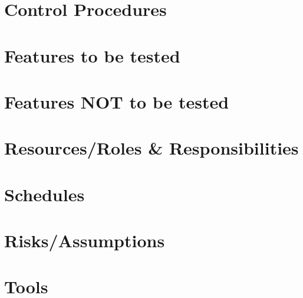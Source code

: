 \documentclass[a4paper, 10pt]{article}
\begin{document}
\section{Control Procedures}

\section{Features to be tested}

\section{Features NOT to be tested}

\section{Resources/Roles \& Responsibilities}

\section{Schedules}

\section{Risks/Assumptions}

\section{Tools}
\end{document}
